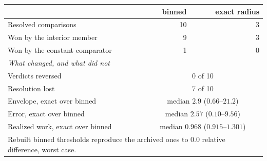 \begin{tabular}{lrr}
\toprule
& binned & exact radius \\
\midrule
Resolved comparisons & 10 & 3 \\
Won by the interior member & 9 & 3 \\
Won by the constant comparator & 1 & 0 \\
\midrule
\multicolumn{3}{l}{\emph{What changed, and what did not}} \\
Verdicts reversed & \multicolumn{2}{c}{0 of 10} \\
Resolution lost & \multicolumn{2}{c}{7 of 10} \\
Envelope, exact over binned & \multicolumn{2}{c}{median $2.9$ ($0.66$--$21.2$)} \\
Error, exact over binned & \multicolumn{2}{c}{median $2.57$ ($0.10$--$9.56$)} \\
Realized work, exact over binned & \multicolumn{2}{c}{median $0.968$ ($0.915$--$1.301$)} \\
\midrule
\multicolumn{3}{l}{\footnotesize Rebuilt binned thresholds reproduce the archived ones to $0.0$ relative difference, worst case.} \\
\bottomrule
\end{tabular}
